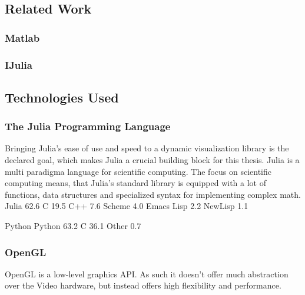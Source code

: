 \subsection{Related Work}

\subsubsection{Matlab}

\subsubsection{IJulia}

\subsection{Technologies Used}


\subsubsection{The Julia Programming Language}
Bringing Julia's ease of use and speed to a dynamic visualization library is the declared goal, which makes Julia a crucial building block for this thesis.
Julia is a multi paradigma language for scientific computing.
The focus on scientific computing means, that Julia's standard library is equipped with a lot of functions, data structures and specialized syntax for implementing complex math.
 Julia 62.6	 C 19.5	 C++ 7.6	Scheme 4.0	 Emacs Lisp 2.2	 NewLisp 1.1


 Python 
  Python 63.2	 C 36.1	 Other 0.7

\subsubsection{OpenGL}
OpenGL is a low-level graphics API. As such it doesn't offer much abstraction over the Video hardware, but instead offers high flexibility and performance.

